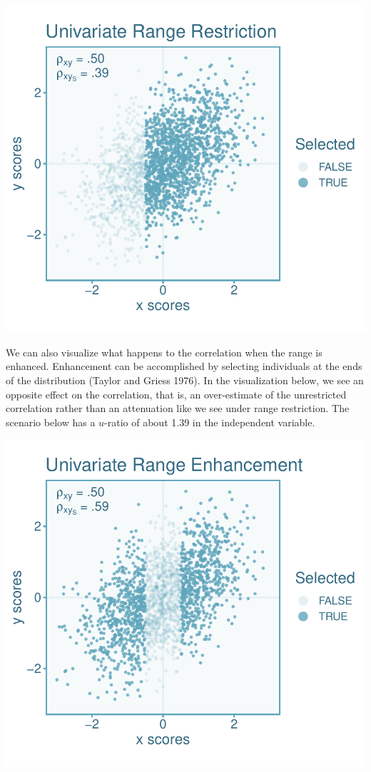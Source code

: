 \documentclass[
  letterpaper,
  DIV=11,
  numbers=noendperiod]{scrreprt}
\begin{document}
\includegraphics{direct_range_restriction_files/figure-pdf/unnamed-chunk-2-1.pdf}

We can also visualize what happens to the correlation when the range is
enhanced. Enhancement can be accomplished by selecting individuals at
the ends of the distribution (Taylor and Griess 1976). In the
visualization below, we see an opposite effect on the correlation, that
is, an over-estimate of the unrestricted correlation rather than an
attenuation like we see under range restriction. The scenario below has
a \(u\)-ratio of about 1.39 in the independent variable.

\includegraphics{direct_range_restriction_files/figure-pdf/unnamed-chunk-3-1.pdf}
\end{document}
